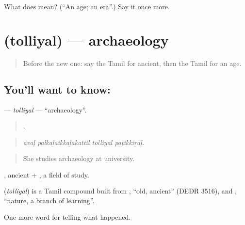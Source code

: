 \begin{tcolorbox}[breakable,colback=teal!4,colframe=teal!35!black,title={Before you move on}]
What does  mean? (\textquotedblleft{}An age; an era\textquotedblright{}.) Say it once more.
\end{tcolorbox}
\section[\texorpdfstring{\ta{தொல்லியல்} (tolliyal)}{தொல்லியல் (tolliyal)}]{ (tolliyal) — archaeology}

\label{lesson:TA-C342-tolliyal}



\begin{quote}
Before the new one: say the Tamil for ancient, then the Tamil for an age.
\end{quote}

\subsection*{You'll want to know: }
\textbf{} — \emph{tolliyal} — \textquotedblleft{}archaeology\textquotedblright{}.

\begin{quote}
   .
\end{quote}

\begin{quote}
\emph{avaḷ palkalaikkaḻakattil tolliyal paṭikkiṟāḷ.}
\end{quote}

\begin{quote}
She studies archaeology at university.
\end{quote}

, ancient + , a field of study.

\begin{cousinweb}
\textbf{} (\emph{tolliyal}) is a Tamil compound built from , \textquotedblleft{}old, ancient\textquotedblright{} (DEDR 3516), and , \textquotedblleft{}nature, a branch of learning\textquotedblright{}.
\end{cousinweb}

\begin{grammarlens}[title={What you've built}]
One more word for telling what happened.
\end{grammarlens}

